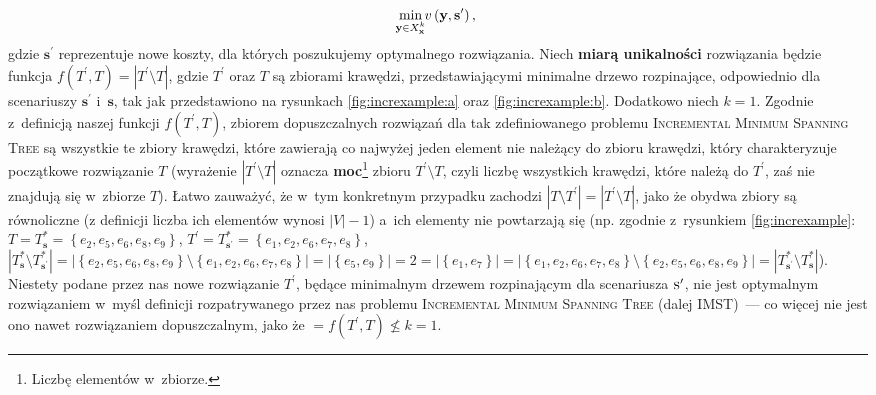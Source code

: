 \begin{equation}
	\min_{\mathclap{\textbf{y} \in X^{k}_{\textbf{x}}}} v \left( \textbf{y}, \textbf{s}^{\prime} \right)\text{,}
\end{equation}\label{eq:imst}
gdzie $\textbf{s}^{\prime}$ reprezentuje nowe koszty, dla których poszukujemy optymalnego rozwiązania.
Niech \textbf{miarą unikalności} rozwiązania będzie funkcja $f \left( T^{\prime}, T \right) = \left| T^{\prime} \setminus T \right|$, gdzie $T^{\prime}$ oraz $T$ są zbiorami krawędzi, przedstawiającymi minimalne drzewo rozpinające, odpowiednio dla scenariuszy $\textbf{s}^{\prime}$ i~$\textbf{s}$, tak jak przedstawiono na rysunkach \ref{fig:increxample:a} oraz \ref{fig:increxample:b}.
Dodatkowo niech $k = 1$.
Zgodnie z~definicją naszej funkcji $f \left( T^{\prime}, T \right)$, zbiorem dopuszczalnych rozwiązań dla tak zdefiniowanego problemu \textsc{Incremental Minimum Spanning Tree} są wszystkie te zbiory krawędzi, które zawierają co najwyżej jeden element nie należący do zbioru krawędzi, który charakteryzuje początkowe rozwiązanie $T$ (wyrażenie $\left| T^{\prime} \setminus T \right|$ oznacza \textbf{moc}\footnote{
	Liczbę elementów w~zbiorze.
} zbioru $T^{\prime} \setminus T$, czyli liczbę wszystkich krawędzi, które należą do $T^{\prime}$, zaś nie znajdują się w~zbiorze $T$).
Łatwo zauważyć, że w~tym konkretnym przypadku zachodzi $\left| T \setminus T^{\prime} \right| = \left| T^{\prime} \setminus T \right|$, jako że obydwa zbiory są równoliczne (z definicji liczba ich elementów wynosi $\left| V \right| - 1$) a~ich elementy nie powtarzają się (np. zgodnie z~rysunkiem \ref{fig:increxample}: $T = T^{\ast}_{\textbf{s}} = \left\{ e_{2}, e_{5}, e_{6}, e_{8}, e_{9} \right\}$, $T^{\prime} = T^{\ast}_{\textbf{s}^{\prime}} = \left\{ e_{1}, e_{2}, e_{6}, e_{7}, e_{8} \right\}$, $\left| T^{\ast}_{\textbf{s}} \setminus T^{\ast}_{\textbf{s}^{\prime}} \right| = \left| \left\{ e_{2}, e_{5}, e_{6}, e_{8}, e_{9} \right\} \setminus \left\{ e_{1}, e_{2}, e_{6}, e_{7}, e_{8} \right\} \right| = \left| \left\{ e_{5}, e_{9} \right\} \right| = 2 = \left| \left\{ e_{1}, e_{7} \right\} \right| = \left| \left\{ e_{1}, e_{2}, e_{6}, e_{7}, e_{8} \right\} \setminus \left\{ e_{2}, e_{5}, e_{6}, e_{8}, e_{9} \right\} \right| = \left| T^{\ast}_{\textbf{s}^{\prime}} \setminus T^{\ast}_{\textbf{s}} \right|$).
Niestety podane przez nas nowe rozwiązanie $T^{\prime}$, będące minimalnym drzewem rozpinającym dla scenariusza $\textsc{s}^{\prime}$, nie jest optymalnym rozwiązaniem w~myśl definicji rozpatrywanego przez nas problemu \textsc{Incremental Minimum Spanning Tree} (dalej \textsc{IMST})~--- co więcej nie jest ono nawet rozwiązaniem dopuszczalnym, jako że $ = f \left( T^{\prime}, T \right) \nleqslant k = 1$.



